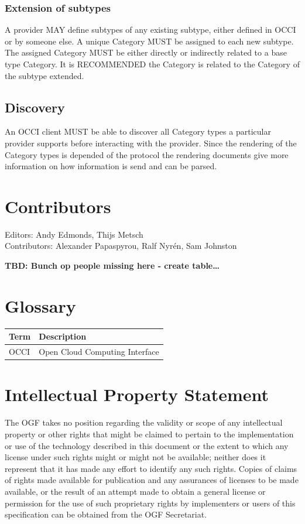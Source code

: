 \documentclass[10pt,a4paper]{article}
\begin{document}
\subsubsection{Extension of subtypes}
A provider MAY define subtypes of any existing subtype, either defined in OCCI
or by someone else. A unique Category MUST be assigned to each new subtype. The
assigned Category MUST be either directly or indirectly related to a base type
Category. It is RECOMMENDED the Category is related to the Category of the
subtype extended.

\subsection{Discovery}
An OCCI client MUST be able to discover all Category types a particular
provider supports before interacting with the provider. Since the rendering of
the Category types is depended of the protocol the rendering documents give
more information on how information is send and can be parsed.

\section{Contributors}
Editors: Andy Edmonds, Thijs Metsch \\
Contributors: Alexander Papaspyrou, Ralf Nyrén, Sam Johnston

\textbf{TBD: Bunch op people missing here - create table\ldots}

\section{Glossary}

\begin{tabular}{l|l}
Term & Description \\
\hline
OCCI & Open Cloud Computing Interface \\
\end{tabular}

\section{Intellectual Property Statement}

The OGF takes no position regarding the validity or scope of any intellectual property or other rights that might be claimed to pertain to the implementation or use of the technology described in this document or the extent to which any license under such rights might or might not be available; neither does it represent that it has made any effort to identify any such rights. Copies of claims of rights made available for publication and any assurances of licenses to be made available, or the result of an attempt made to obtain a general license or permission for the use of such proprietary rights by implementers or users of this specification can be obtained from the OGF Secretariat.
\end{document}
